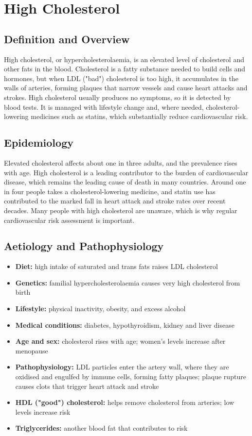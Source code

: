 \chapter{High Cholesterol}

\section*{Definition and Overview}
High cholesterol, or hypercholesterolaemia, is an elevated level of cholesterol and other fats in the blood. Cholesterol is a fatty substance needed to build cells and hormones, but when LDL ("bad") cholesterol is too high, it accumulates in the walls of arteries, forming plaques that narrow vessels and cause heart attacks and strokes. High cholesterol usually produces no symptoms, so it is detected by blood tests. It is managed with lifestyle change and, where needed, cholesterol-lowering medicines such as statins, which substantially reduce cardiovascular risk.

\section*{Epidemiology}
Elevated cholesterol affects about one in three adults, and the prevalence rises with age. High cholesterol is a leading contributor to the burden of cardiovascular disease, which remains the leading cause of death in many countries. Around one in four people takes a cholesterol-lowering medicine, and statin use has contributed to the marked fall in heart attack and stroke rates over recent decades. Many people with high cholesterol are unaware, which is why regular cardiovascular risk assessment is important.

\section*{Aetiology and Pathophysiology}
\begin{itemize}
    \item \textbf{Diet:} high intake of saturated and trans fats raises LDL cholesterol
    \item \textbf{Genetics:} familial hypercholesterolaemia causes very high cholesterol from birth
    \item \textbf{Lifestyle:} physical inactivity, obesity, and excess alcohol
    \item \textbf{Medical conditions:} diabetes, hypothyroidism, kidney and liver disease
    \item \textbf{Age and sex:} cholesterol rises with age; women's levels increase after menopause
    \item \textbf{Pathophysiology:} LDL particles enter the artery wall, where they are oxidised and engulfed by immune cells, forming fatty plaques; plaque rupture causes clots that trigger heart attack and stroke
    \item \textbf{HDL ("good") cholesterol:} helps remove cholesterol from arteries; low levels increase risk
    \item \textbf{Triglycerides:} another blood fat that contributes to risk
\end{itemize}

